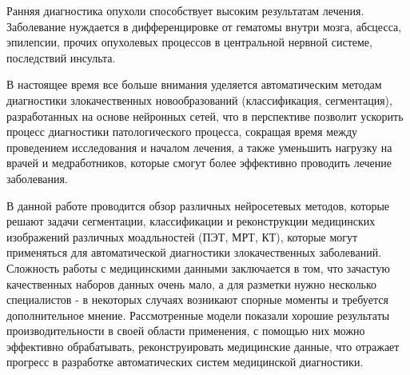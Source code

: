 Ранняя диагностика опухоли способствует высоким результатам лечения.
Заболевание нуждается в дифференцировке от гематомы внутри мозга, абсцесса,
эпилепсии, прочих опухолевых процессов в центральной нервной системе,
последствий инсульта. \par 

В настоящее время все больше внимания уделяется автоматическим методам диагностики злокачественных 
новообразований (классификация, сегментация), разработанных на основе нейронных сетей, что в перспективе 
позволит ускорить процесс диагностики патологического процесса, сокращая время между проведением исследования и началом лечения, а также уменьшить
нагрузку на врачей и медработников, которые смогут более эффективно проводить лечение заболевания.

В данной работе проводится обзор различных нейросетевых методов, которые решают задачи сегментации, классификации и 
реконструкции медицинских изображений различных моадльностей (ПЭТ, МРТ, КТ), которые могут 
применяться для автоматической диагностики злокачественных заболеваний.
Сложность работы с медицинскими данными заключается в том, что зачастую качественных наборов данных очень мало, а для разметки нужно
несколько специалистов - в некоторых случаях возникают спорные моменты
и требуется дополнительное мнение. Рассмотренные модели показали хорошие результаты производительности в своей области применения, с помощью
них можно эффективно обрабатывать, реконструировать медицинские данные, что отражает прогресс в разработке автоматических систем медицинской диагностики.



